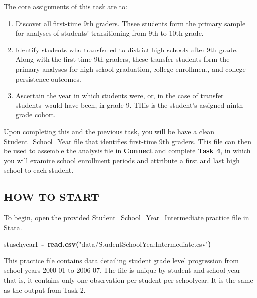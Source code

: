 \documentclass[12pt]{article}
\makeatletter
\newcommand{\hlfunctioncall}[1]{\textcolor[rgb]{0.501960784313725,0,0.329411764705882}{\textbf{#1}}}%
\newcommand{\hlstring}[1]{\textcolor[rgb]{0.6,0.6,1}{#1}}%
\newcommand{\hlkeyword}[1]{\textcolor[rgb]{0,0,0}{\textbf{#1}}}%
\newcommand{\hlassignement}[1]{\textcolor[rgb]{0,0,0}{\textbf{#1}}}%
\newcommand{\hlsymbol}[1]{\textcolor[rgb]{0,0,0}{#1}}%
\newenvironment{kframe}{%
 \def\FrameCommand##1{\hskip\@totalleftmargin \hskip-\fboxsep
 \colorbox{shadecolor}{##1}\hskip-\fboxsep
     \hskip-\linewidth \hskip-\@totalleftmargin \hskip\columnwidth}%
 \MakeFramed {\advance\hsize-\width
   \@totalleftmargin\z@ \linewidth\hsize
   \@setminipage}}%
 {\par\unskip\endMakeFramed}
\newenvironment{knitrout}{}{} %
\renewenvironment{knitrout}{\begin{footnotesize}}{\end{footnotesize}}
\makeatother
\begin{document}
\noindent The core assignments of this task are to:
\begin{enumerate}
\item Discover all first-time 9th graders. Thsee students form the primary sample for analyses of students' transitioning from 9th to 10th grade.
\item Identify students who transferred to district high schools after 9th grade. Along with the first-time 9th graders, these transfer students form the primary analyses for high school graduation, college enrollment, and college persistence outcomes.
\item Ascertain the year in which students were, or, in the case of transfer students--would have been, in grade 9. THis is the student's assigned ninth grade cohort.
\end{enumerate}

Upon completing this and the previous task, you will be have a clean Student\_School\_Year file that identifies first-time 9th 
graders.  This file can then be used to assemble the analysis file in \textbf{Connect} and complete \textbf{Task 4}, in which you will examine 
school enrollment periods and attribute a first and last high school to each student.

\subsection{HOW TO START}

To begin, open the provided Student\_School\_Year\_Intermediate practice file in Stata.

\begin{knitrout}
\color{fgcolor}\begin{kframe}
\begin{flushleft}
\ttfamily\noindent
\hlsymbol{stuschyearI}{\ }\hlassignement{\usebox{\hlnormalsizeboxlessthan}-}{\ }\hlfunctioncall{read.csv}\hlkeyword{(}\hlstring{"{}data/Student\usebox{\hlnormalsizeboxunderscore}School\usebox{\hlnormalsizeboxunderscore}Year\usebox{\hlnormalsizeboxunderscore}Intermediate.csv"{}}\hlkeyword{)}\mbox{}
\normalfont
\end{flushleft}
\end{kframe}
\end{knitrout}


This practice file contains data detailing student grade level progression from school years 2000-01 to 2006-07. The file is unique by student 
and school year—that is, it contains only one observation per student per schoolyear. It is the same as the output from Task 2.\\
\end{document}
